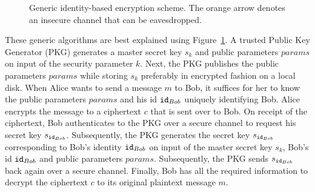 \begin{figure}[ht]
\begin{center}
{
    }
    \end{center}
    \caption{Generic identity-based encryption scheme. The orange arrow denotes an insecure channel that can be eavesdropped.}
    \label{fig:generic_ibe_scheme}
\end{figure}

These generic algorithms are best explained using Figure~\ref{fig:generic_ibe_scheme}. A trusted Public Key Generator (PKG) generates a master secret key $s_k$ and public parameters $params$ on input of the security parameter $k$. Next, the PKG publishes the public parameters $params$ while storing $s_k$ preferably in encrypted fashion on a local disk. When Alice wants to send a message $m$ to Bob, it suffices for her to know the public parameters $params$ and his id $\mathtt{id}_{Bob}$ uniquely identifying Bob. Alice encrypts the message to a ciphertext $c$ that is sent over to Bob. On receipt of the ciphertext, Bob authenticates to the PKG over a secure channel to request his secret key $s_{\mathtt{id}_{Bob}}$. Subsequently, the PKG generates the secret key $s_{\mathtt{id}_{Bob}}$ corresponding to Bob's identity $\mathtt{id}_{Bob}$ on input of the master secret key $s_k$, Bob's id $\mathtt{id}_{Bob}$ and public parameters $params$. Subsequently, the PKG sends $s_{\mathtt{id}_{Bob}}$ back again over a secure channel. Finally, Bob has all the required information to decrypt the ciphertext $c$ to its original plaintext message $m$.

